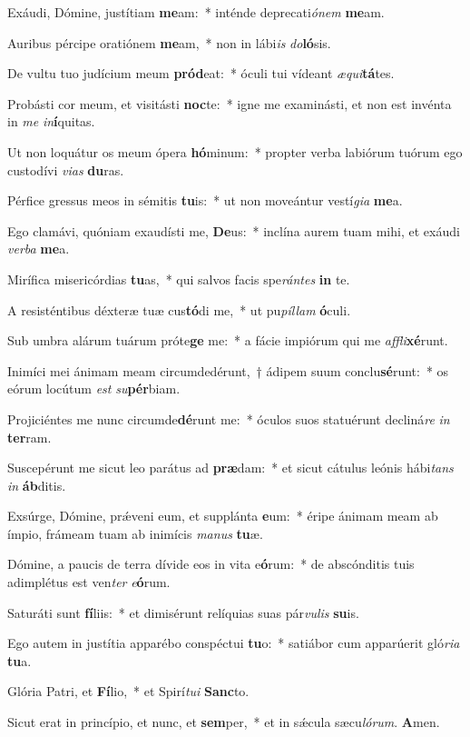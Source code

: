 \item Exáudi, Dómine, justítiam \textbf{me}am:~* inténde deprecati\textit{ó}\textit{nem} \textbf{me}am.
\item Auribus pércipe oratiónem \textbf{me}am,~* non in lábi\textit{is} \textit{do}\textbf{ló}sis.
\item De vultu tuo judícium meum \textbf{pród}eat:~* óculi tui vídeant \textit{æ}\textit{qui}\textbf{tá}tes.
\item Probásti cor meum, et visitásti \textbf{noc}te:~* igne me examinásti, et non est invénta in \textit{me} \textit{in}\textbf{í}quitas.
\item Ut non loquátur os meum ópera \textbf{hó}minum:~* propter verba labiórum tuórum ego custodívi \textit{vi}\textit{as} \textbf{du}ras.
\item Pérfice gressus meos in sémitis \textbf{tu}is:~* ut non moveántur vestí\textit{gi}\textit{a} \textbf{me}a.
\item Ego clamávi, quóniam exaudísti me, \textbf{De}us:~* inclína aurem tuam mihi, et exáudi \textit{ver}\textit{ba} \textbf{me}a.
\item Mirífica misericórdias \textbf{tu}as,~* qui salvos facis spe\textit{rán}\textit{tes} \textbf{in} te.
\item A resisténtibus déxteræ tuæ cus\textbf{tó}di me,~* ut pu\textit{píl}\textit{lam} \textbf{ó}culi.
\item Sub umbra alárum tuárum próte\textbf{ge} me:~* a fácie impiórum qui me \textit{af}\textit{fli}\textbf{xé}runt.
\item Inimíci mei ánimam meam circumdedérunt,~† ádipem suum conclu\textbf{sé}runt:~* os eórum locútum \textit{est} \textit{su}\textbf{pér}biam.
\item Projiciéntes me nunc circumde\textbf{dé}runt me:~* óculos suos statuérunt decliná\textit{re} \textit{in} \textbf{ter}ram.
\item Suscepérunt me sicut leo parátus ad \textbf{præ}dam:~* et sicut cátulus leónis hábi\textit{tans} \textit{in} \textbf{áb}ditis.
\item Exsúrge, Dómine, prǽveni eum, et supplánta \textbf{e}um:~* éripe ánimam meam ab ímpio, frámeam tuam ab inimícis \textit{ma}\textit{nus} \textbf{tu}æ.
\item Dómine, a paucis de terra dívide eos in vita e\textbf{ó}rum:~* de abscónditis tuis adimplétus est ven\textit{ter} \textit{e}\textbf{ó}rum.
\item Saturáti sunt \textbf{fí}liis:~* et dimisérunt relíquias suas pár\textit{vu}\textit{lis} \textbf{su}is.
\item Ego autem in justítia apparébo conspéctui \textbf{tu}o:~* satiábor cum apparúerit gló\textit{ri}\textit{a} \textbf{tu}a.
\item Glória Patri, et \textbf{Fí}lio,~* et Spirí\textit{tu}\textit{i} \textbf{Sanc}to.
\item Sicut erat in princípio, et nunc, et \textbf{sem}per,~* et in sǽcula sæcu\textit{ló}\textit{rum}. \textbf{A}men.
